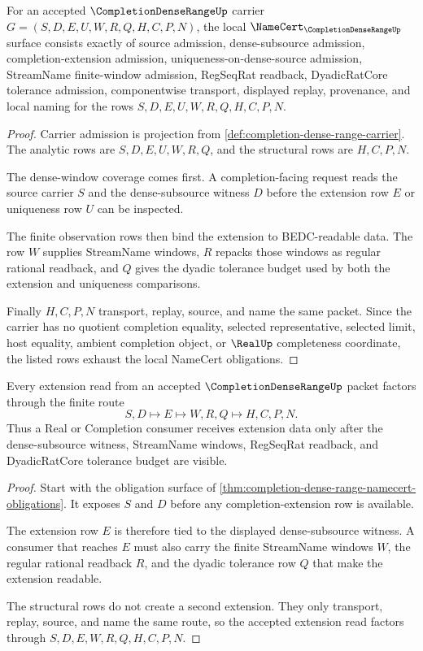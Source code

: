 \begin{theorem}\label{thm:completion-dense-range-namecert-obligations}
For an accepted $\CompletionDenseRangeUp$ carrier $G=(S,D,E,U,W,R,Q,H,C,P,N)$, the local $\NameCert_{\CompletionDenseRangeUp}$ surface consists exactly of source admission, dense-subsource admission, completion-extension admission, uniqueness-on-dense-source admission, StreamName finite-window admission, RegSeqRat readback, DyadicRatCore tolerance admission, componentwise transport, displayed replay, provenance, and local naming for the rows $S,D,E,U,W,R,Q,H,C,P,N$.
\end{theorem}
\begin{proof}
Carrier admission is projection from \autoref{def:completion-dense-range-carrier}. The analytic rows are $S,D,E,U,W,R,Q$, and the structural rows are $H,C,P,N$.

The dense-window coverage comes first. A completion-facing request reads the source carrier $S$ and the dense-subsource witness $D$ before the extension row $E$ or uniqueness row $U$ can be inspected.

The finite observation rows then bind the extension to BEDC-readable data. The row $W$ supplies StreamName windows, $R$ repacks those windows as regular rational readback, and $Q$ gives the dyadic tolerance budget used by both the extension and uniqueness comparisons.

Finally $H,C,P,N$ transport, replay, source, and name the same packet. Since the carrier has no quotient completion equality, selected representative, selected limit, host equality, ambient completion object, or $\RealUp$ completeness coordinate, the listed rows exhaust the local NameCert obligations.
\end{proof}

\begin{theorem}\label{thm:completion-dense-range-extension}
Every extension read from an accepted $\CompletionDenseRangeUp$ packet factors through the finite route
$$
S,D \longmapsto E \longmapsto W,R,Q \longmapsto H,C,P,N .
$$
Thus a Real or Completion consumer receives extension data only after the dense-subsource witness, StreamName windows, RegSeqRat readback, and DyadicRatCore tolerance budget are visible.
\end{theorem}
\begin{proof}
Start with the obligation surface of \autoref{thm:completion-dense-range-namecert-obligations}. It exposes $S$ and $D$ before any completion-extension row is available.

The extension row $E$ is therefore tied to the displayed dense-subsource witness. A consumer that reaches $E$ must also carry the finite StreamName windows $W$, the regular rational readback $R$, and the dyadic tolerance row $Q$ that make the extension readable.

The structural rows do not create a second extension. They only transport, replay, source, and name the same route, so the accepted extension read factors through $S,D,E,W,R,Q,H,C,P,N$.
\end{proof}

